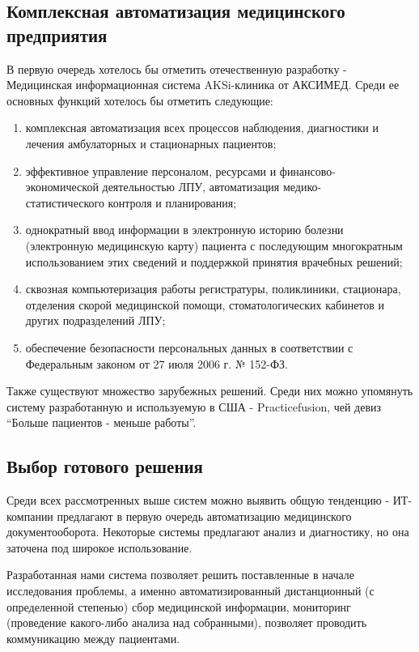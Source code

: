 \subsection{Комплексная автоматизация медицинского предприятия}
В первую очередь хотелось бы отметить отечественную разработку - Медицинская
информационная система AKSi-клиника от АКСИМЕД. Среди ее основных функций
хотелось бы отметить следующие:

\begin{enumerate}
  \item комплексная автоматизация всех процессов наблюдения, диагностики и
  лечения амбулаторных и стационарных пациентов;
  \item эффективное управление персоналом, ресурсами и
  финансово-\\экономической деятельностью ЛПУ, автоматизация
  медико-\\статистического контроля и планирования;
  \item однократный ввод информации в электронную историю болезни (электронную
  медицинскую карту) пациента с последующим многократным использованием этих сведений и поддержкой принятия врачебных решений;
  \item сквозная компьютеризация работы регистратуры, поликлиники, стационара,
  отделения скорой медицинской помощи, стоматологических кабинетов и других подразделений ЛПУ;
  \item обеспечение безопасности персональных данных в соответствии с
  Федеральным законом от 27 июля 2006 г. № 152-ФЗ.
\end{enumerate}

Также существуют множество зарубежных решений. Среди них можно упомянуть систему
разработанную и используемую в США - Practicefusion, чей девиз “Больше пациентов
- меньше работы”.

\subsection{Выбор готового решения}
Среди всех рассмотренных выше систем можно выявить общую тенденцию - ИТ-компании
предлагают в первую очередь автоматизацию медицинского документооборота.
Некоторые системы предлагают анализ и диагностику, но она заточена под широкое
использование.

Разработанная нами система позволяет решить поставленные в начале исследования
проблемы, а именно автоматизированный дистанционный (с определенной степенью)
сбор медицинской информации, мониторинг (проведение какого-либо анализа над
собранными), позволяет проводить коммуникацию между пациентами.

